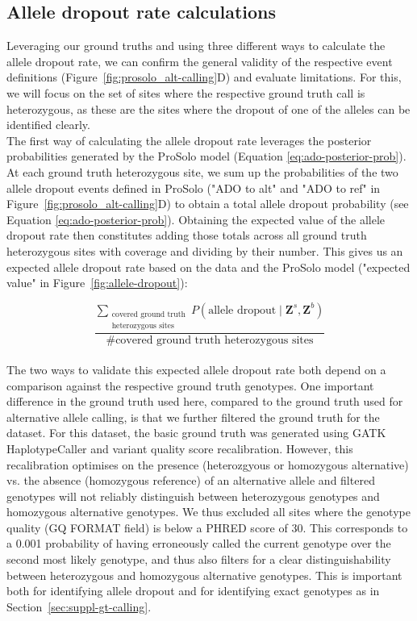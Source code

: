 \documentclass[authoryear,preprint,11pt]{scrartcl}
\newcommand{\Prob}{{P}}
\begin{document}
\subsection{Allele dropout rate calculations} \label{sec:suppl-adr-calc}

Leveraging our ground truths and using three different ways to calculate the allele dropout rate, we can confirm the general validity of the respective event definitions (Figure~\ref{fig:prosolo_alt-calling}D) and evaluate limitations.
For this, we will focus on the set of sites where the respective ground truth call is heterozygous, as these are the sites where the dropout of one of the alleles can be identified clearly.\\

The first way of calculating the allele dropout rate leverages the posterior probabilities generated by the ProSolo model (Equation \ref{eq:ado-posterior-prob}).
At each ground truth heterozygous site, we sum up the probabilities of the two allele dropout events defined in ProSolo ("ADO to alt" and "ADO to ref" in Figure~\ref{fig:prosolo_alt-calling}D) to obtain a total allele dropout probability (see Equation \ref{eq:ado-posterior-prob}).
Obtaining the expected value of the allele dropout rate then constitutes adding those totals across all ground truth heterozygous sites with coverage and dividing by their number.
This gives us an expected allele dropout rate based on the data and the ProSolo model ("expected value" in Figure~\ref{fig:allele-dropout}):

\begin{equation}
    \frac{\displaystyle\sum_{\substack{\text{covered ground truth}\\\text{heterozygous sites}}}  \Prob(\text{allele dropout} \mid \boldsymbol{Z}^s,\boldsymbol{Z}^b )}{\text{\# covered ground truth heterozygous sites}}
    \label{eq.expected-allele-dropout-rate}
\end{equation}\\

The two ways to validate this expected allele dropout rate both depend on a comparison against the respective ground truth genotypes.
One important difference in the ground truth used here, compared to the ground truth used for alternative allele calling, is that we further filtered the ground truth for the \cite{dong_accurate_2017} dataset.
For this dataset, the basic ground truth was generated using GATK HaplotypeCaller and variant quality score recalibration.
However, this recalibration optimises on the presence (heterozgyous or homozygous alternative) vs. the absence (homozygous reference) of an alternative allele and filtered genotypes will not reliably distinguish between heterozygous genotypes and homozygous alternative genotypes.
We thus excluded all sites where the genotype quality ({\ttfamily GQ} FORMAT field) is below a PHRED score of 30.
This corresponds to a 0.001 probability of having erroneously called the current genotype over the second most likely genotype, and thus also filters for a clear distinguishability between heterozygous and homozygous alternative genotypes.
This is important both for identifying allele dropout and for identifying exact genotypes as in Section~\ref{sec:suppl-gt-calling}.
\end{document}

